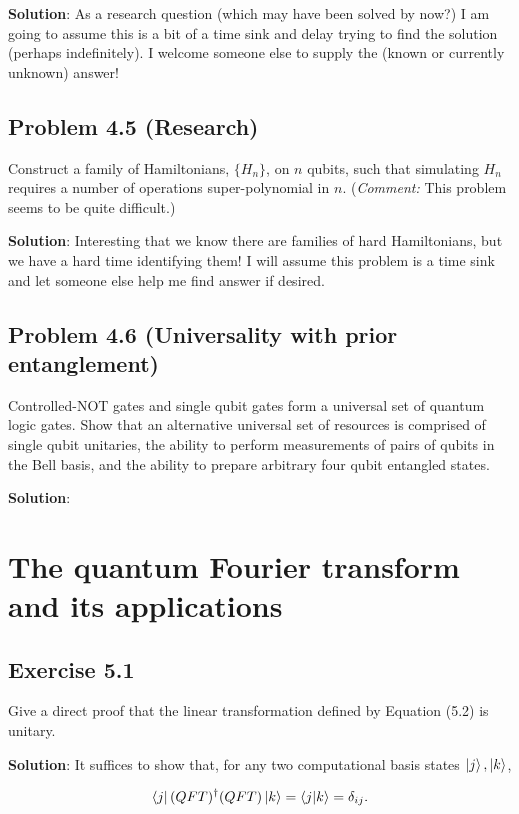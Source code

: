 \documentclass{book}
\begin{document}
    \textbf{Solution}: As a research question (which may have been solved by now?) I am going to assume this is a bit of a time sink and delay trying to find the solution (perhaps indefinitely). I welcome someone else to supply the (known or currently unknown) answer!

\section*{Problem 4.5 (Research)}
    Construct a family of Hamiltonians, $\{H_n\}$, on $n$ qubits, such that simulating $H_n$ requires a number of operations super-polynomial in $n$. (\emph{Comment:} This problem seems to be quite difficult.)

    \textbf{Solution}: Interesting that we know there are families of hard Hamiltonians, but we have a hard time identifying them! I will assume this problem is a time sink and let someone else help me find answer if desired.

\section*{Problem 4.6 (Universality with prior entanglement)}
    Controlled-NOT gates and single qubit gates form a universal set of quantum logic gates. Show that an alternative universal set of resources is comprised of single qubit unitaries, the ability to perform measurements of pairs of qubits in the Bell basis, and the ability to prepare arbitrary four qubit entangled states.

    \textbf{Solution}: 

    


\chapter{The quantum Fourier transform and its applications}


\section*{Exercise 5.1}
    Give a direct proof that the linear transformation defined by Equation (5.2) is unitary.
    
    \textbf{Solution}: It suffices to show that, for any two computational basis states $\ket{j}, \ket{k}$,
    
    \begin{align} \label{eq:5.1:QFT_unitary}
        \bra{j}(QFT)^\dagger(QFT)\ket{k} = \braket{j}{k} = \delta_{ij}.
    \end{align}
    
\end{document}

